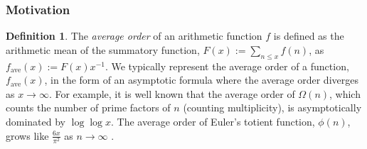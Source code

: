 \documentclass[12pt,reqno,a4letter]{article}
\numberwithin{figure}{section}
\numberwithin{table}{section}
\numberwithin{equation}{section}
\theoremstyle{plain}
\numberwithin{theorem}{section}
\theoremstyle{definition}
\newtheorem{definition}[theorem]{Definition}
\begin{document}
\subsubsection{Motivation}

\begin{definition}
The \emph{average order} of an arithmetic function $f$ is defined as the arithmetic mean of the summatory function, 
$F(x) := \sum_{n \leq x} f(n)$, as $f_{\operatorname{ave}}(x) := F(x) x^{-1}$. We typically represent the average order of 
a function, $f_{\operatorname{ave}}(x)$, 
in the form of an asymptotic formula where the average order diverges as $x \rightarrow \infty$. 
For example, it is well known that the average order of $\Omega(n)$, which counts the 
number of prime factors of $n$ (counting multiplicity), is 
asymptotically dominated by $\log\log x$. The average order of Euler's totient 
function, $\phi(n)$, grows like $\frac{6x}{\pi^2}$ as $n \rightarrow \infty$ \cite{HARDYWRIGHT}. 
\end{definition}
\end{document}
